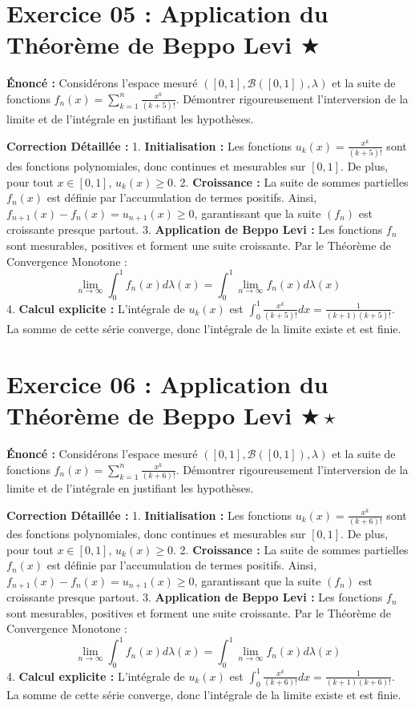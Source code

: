 \documentclass[11pt,a4paper]{article}
\begin{document}
\vspace{1cm}

\section*{Exercice 05 : Application du Théorème de Beppo Levi \quad $\bigstar$}

\textbf{Énoncé :}
Considérons l'espace mesuré $([0, 1], \mathcal{B}([0, 1]), \lambda)$ et la suite de fonctions $f_n(x) = \sum_{k=1}^n \frac{x^k}{(k+5)!}$.
Démontrer rigoureusement l'interversion de la limite et de l'intégrale en justifiant les hypothèses.

\textbf{Correction Détaillée :}
1. \textbf{Initialisation :}
   Les fonctions $u_k(x) = \frac{x^k}{(k+5)!}$ sont des fonctions polynomiales, donc continues et mesurables sur $[0, 1]$. De plus, pour tout $x \in [0, 1]$, $u_k(x) \ge 0$.
2. \textbf{Croissance :}
   La suite de sommes partielles $f_n(x)$ est définie par l'accumulation de termes positifs. Ainsi, $f_{n+1}(x) - f_n(x) = u_{n+1}(x) \ge 0$, garantissant que la suite $(f_n)$ est croissante presque partout.
3. \textbf{Application de Beppo Levi :}
   Les fonctions $f_n$ sont mesurables, positives et forment une suite croissante. Par le Théorème de Convergence Monotone :
   $$\lim_{n \to \infty} \int_0^1 f_n(x) d\lambda(x) = \int_0^1 \lim_{n \to \infty} f_n(x) d\lambda(x)$$
4. \textbf{Calcul explicite :}
   L'intégrale de $u_k(x)$ est $\int_0^1 \frac{x^k}{(k+5)!} dx = \frac{1}{(k+1)(k+5)!}$.
   La somme de cette série converge, donc l'intégrale de la limite existe et est finie.

\vspace{1cm}

\section*{Exercice 06 : Application du Théorème de Beppo Levi \quad $\bigstar\star$}

\textbf{Énoncé :}
Considérons l'espace mesuré $([0, 1], \mathcal{B}([0, 1]), \lambda)$ et la suite de fonctions $f_n(x) = \sum_{k=1}^n \frac{x^k}{(k+6)!}$.
Démontrer rigoureusement l'interversion de la limite et de l'intégrale en justifiant les hypothèses.

\textbf{Correction Détaillée :}
1. \textbf{Initialisation :}
   Les fonctions $u_k(x) = \frac{x^k}{(k+6)!}$ sont des fonctions polynomiales, donc continues et mesurables sur $[0, 1]$. De plus, pour tout $x \in [0, 1]$, $u_k(x) \ge 0$.
2. \textbf{Croissance :}
   La suite de sommes partielles $f_n(x)$ est définie par l'accumulation de termes positifs. Ainsi, $f_{n+1}(x) - f_n(x) = u_{n+1}(x) \ge 0$, garantissant que la suite $(f_n)$ est croissante presque partout.
3. \textbf{Application de Beppo Levi :}
   Les fonctions $f_n$ sont mesurables, positives et forment une suite croissante. Par le Théorème de Convergence Monotone :
   $$\lim_{n \to \infty} \int_0^1 f_n(x) d\lambda(x) = \int_0^1 \lim_{n \to \infty} f_n(x) d\lambda(x)$$
4. \textbf{Calcul explicite :}
   L'intégrale de $u_k(x)$ est $\int_0^1 \frac{x^k}{(k+6)!} dx = \frac{1}{(k+1)(k+6)!}$.
   La somme de cette série converge, donc l'intégrale de la limite existe et est finie.
\end{document}
